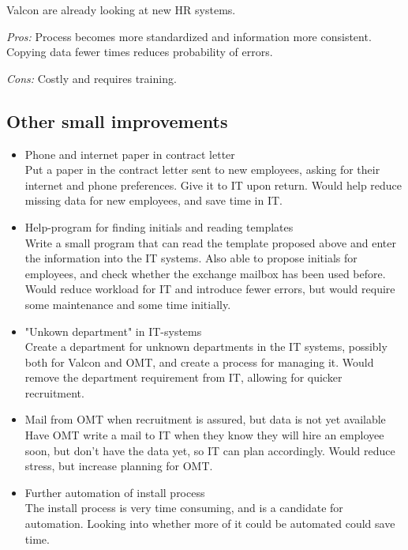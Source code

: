 Valcon are already looking at new HR systems.

\noindent \emph{Pros:} Process becomes more standardized and information more consistent. Copying data fewer times reduces probability of errors.

\noindent \emph{Cons:} Costly and requires training.

\subsection{Other small improvements}
\begin{itemize}
	\item Phone and internet paper in contract letter\\
	
			Put a paper in the contract letter sent to new employees, asking for their internet and phone preferences. Give it to IT upon return. Would help reduce missing data for new employees, and save time in IT.

	\item Help-program for finding initials and reading templates\\
	
			Write a small program that can read the template proposed above and enter the information into the IT systems.
			Also able to propose initials for employees, and check whether the exchange mailbox has been used before.
			Would reduce workload for IT and introduce fewer errors, but would require some maintenance and some time initially.
	
	\item "Unkown department" in IT-systems\\
	
			Create a department for unknown departments in the IT systems, possibly both for Valcon and OMT, and create a process for managing it.
			Would remove the department requirement from IT, allowing for quicker recruitment.
			
	\item Mail from OMT when recruitment is assured, but data is not yet available\\
	
			Have OMT write a mail to IT when they know they will hire an employee soon, but don't have the data yet, so IT can plan accordingly.
			Would reduce stress, but increase planning for OMT.
			
	\item Further automation of install process\\
	
			The install process is very time consuming, and is a candidate for automation.
			Looking into whether more of it could be automated could save time.
\end{itemize}